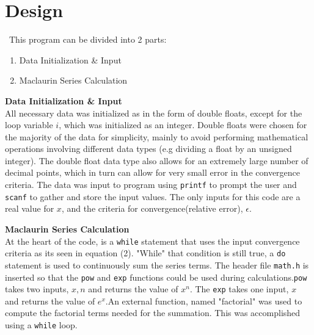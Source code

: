 \documentclass[11pt]{report}
\newcommand{\code}[1]{\colorbox{light-gray}{\texttt{#1}}}
\begin{document}
\section{Design}
\ This program can be divided into 2 parts: 
\begin{enumerate}
\item Data Initialization \& Input
\item Maclaurin Series Calculation
\end{enumerate}
\begin{outline}
\item\textbf{Data Initialization \& Input}
\\All necessary data was initialized as in the form of double floats, except for the loop variable $i$, which was initialized as an integer. Double floats were chosen for the majority of the data for simplicity, mainly to avoid performing mathematical operations involving different data types (e.g dividing a float by an unsigned integer). The double float data type also allows for an extremely large number of decimal points, which in turn can allow for very small error in the convergence criteria. The data was input to program using \code{printf} to prompt the user and \code{scanf} to gather and store the input values. The only inputs for this code are a real value for $x$, and the criteria for convergence(relative error), $\epsilon$.
\item \textbf{Maclaurin Series Calculation}
\\ At the heart of the code, is a \code{while} statement that uses the input convergence criteria as its seen in equation (2). "While" that condition is still true, a \code{do} statement is used to continuously sum the series terms. The header file \code{math.h} is inserted so that the \code{pow} and \code{exp} functions could be used during calculations.\code{pow} takes two inputs, $x,n$ and returns the value of $x^n$. The \code{exp} takes one input, $x$ and returns the value of $e^x$.An external function, named "factorial" was used to compute the factorial terms needed for the summation. This was accomplished using a \code{while} loop.
\end{outline}
\newpage
\end{document}
